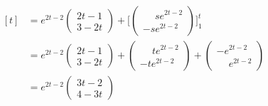 \documentclass[11pt]{report}
\begin{document}
\[\begin{aligned}[t]
    &= e^{2t-2}\begin{pmatrix}
        2t-1 \\
        3-2t
    \end{pmatrix}+\Biggl[\begin{pmatrix}
        \phantom{-}se^{2t-2} \\
        -se^{2t-2}
    \end{pmatrix}\Biggr]_1^t \\
    &= e^{2t-2}\begin{pmatrix}
        2t-1 \\
        3-2t
    \end{pmatrix}+\begin{pmatrix}
        \phantom{-}te^{2t-2} \\
        -te^{2t-2}
    \end{pmatrix}+\begin{pmatrix}
        -e^{2t-2} \\
        \phantom{-}e^{2t-2}
    \end{pmatrix} \\
    &= e^{2t-2}\begin{pmatrix}
        3t-2 \\
        4-3t
    \end{pmatrix}
\end{aligned}\]
\end{document}
